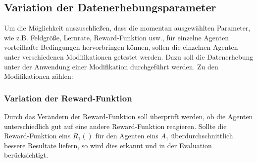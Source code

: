 \subsection{Variation der Datenerhebungsparameter}
Um die Möglichkeit auszuschließen, dass die momentan ausgewählten Parameter, wie z.B. Feldgröße, Lernrate, Reward-Funktion usw., für einzelne Agenten vorteilhafte Bedingungen hervorbringen können, sollen die einzelnen Agenten unter verschiedenen Modifikationen getestet werden. Dazu soll die Datenerhebung unter der Anwendung einer Modifikation durchgeführt werden. Zu den Modifikationen zählen:

\subsubsection{Variation der Reward-Funktion}
Durch das Verändern der Reward-Funktion soll überprüft werden, ob die Agenten unterschiedlich gut auf eine andere Reward-Funktion reagieren. Sollte die Reward-Funktion eins $R_{1}()$ für den Agenten eins $A_{1}$ überdurchschnittlich bessere Resultate liefern, so wird dies erkannt und in der Evaluation berücksichtigt.

